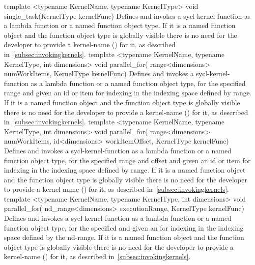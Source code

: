    \addRowTwoL
    {template <typename KernelName, typename KernelType>}
    {void single_task(KernelType kernelFunc)}
    {
      Defines and invokes a \gls{sycl-kernel-function} as a lambda function
      or a named function object type.
      If it is a named function object and the function object type is globally
      visible there is no need for the developer
      to provide a \gls{kernel-name} () for it,
      as described in~\ref{subsec:invokingkernels}.
    }
   \addRowThreeL
    {template <typename KernelName, typename KernelType, int dimensions>}
    {void parallel_for(}
    {range<dimensions> numWorkItems, KernelType kernelFunc)}
    {
      Defines and invokes a \gls{sycl-kernel-function} as a lambda function
      or a named function object type,
      for the specified range and given an id or item for indexing in the
      indexing space defined by range.
      If it is a named function object and the function object type is globally
      visible there is no need for the developer
      to provide a \gls{kernel-name} () for it,
      as described in~\ref{subsec:invokingkernels}.
    }
    \addRowFourL
    {template <typename KernelName, typename KernelType, int dimensions>}
    {void parallel_for(}
    { range<dimensions> numWorkItems,}
    { id<dimensions> workItemOffset, KernelType kernelFunc)}
    {
      Defines and invokes a \gls{sycl-kernel-function} as a lambda function
      or a named function object type,
      for the specified range and offset and given an id or item for indexing in
      the indexing space defined by range.
      If it is a named function object and the function object type is globally
      visible there is no need for the developer
      to provide a \gls{kernel-name} () for it,
      as described in~\ref{subsec:invokingkernels}.
    }
  \addRowThreeL
    {template <typename KernelName, typename KernelType, int dimensions>}
    {void parallel_for(}
    {nd_range<dimensions> executionRange, KernelType kernelFunc)}
    {
      Defines and invokes a \gls{sycl-kernel-function} as a lambda function
      or a named function object type,
      for the specified  and given an 
      for indexing in the indexing space defined by the \gls{nd-range}.
      If it is a named function object and the function object type is globally
      visible there is no need for the developer
      to provide a \gls{kernel-name} () for it,
      as described in~\ref{subsec:invokingkernels}.
    }
